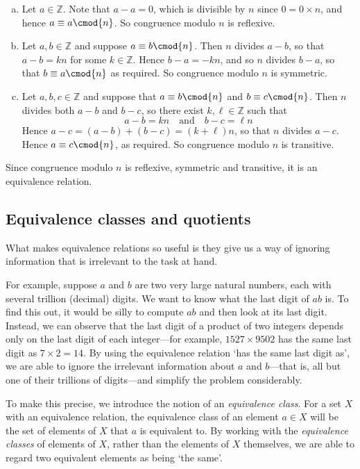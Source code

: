 \begin{cproof}
\fixlistskip
\begin{enumerate}[(a)]
\item Let $a \in \mathbb{Z}$. Note that $a-a=0$, which is divisible by $n$ since $0 = 0 \times n$, and hence $a \equiv a \cmod{n}$. So congruence modulo $n$ is reflexive.
\item Let $a,b \in \mathbb{Z}$ and suppose $a \equiv b \cmod{n}$. Then $n$ divides $a-b$, so that $a-b = kn$ for some $k \in \mathbb{Z}$. Hence $b-a=-kn$, and so $n$ divides $b-a$, so that $b \equiv a \cmod{n}$ as required. So congruence modulo $n$ is symmetric.
\item Let $a,b,c \in \mathbb{Z}$ and suppose that $a \equiv b \cmod{n}$ and $b \equiv c \cmod{n}$. Then $n$ divides both $a-b$ and $b-c$, so there exist $k, \ell \in \mathbb{Z}$ such that
\[ a-b = kn \quad \text{and} \quad b-c = \ell n \]
Hence $a-c = (a-b)+(b-c) = (k+\ell)n$, so that $n$ divides $a-c$. Hence $a \equiv c \cmod{n}$, as required. So congruence modulo $n$ is transitive.
\end{enumerate}
Since congruence modulo $n$ is reflexive, symmetric and transitive, it is an equivalence relation.
\end{cproof}

\subsection*{Equivalence classes and quotients}

What makes equivalence relations so useful is they give us a way of ignoring information that is irrelevant to the task at hand.

For example, suppose $a$ and $b$ are two very large natural numbers, each with several trillion (decimal) digits. We want to know what the last digit of $ab$ is. To find this out, it would be silly to compute $ab$ and then look at its last digit. Instead, we can observe that the last digit of a product of two integers depends only on the last digit of each integer---for example, $1527 \times 9502$ has the same last digit as $7 \times 2 = 14$. By using the equivalence relation `has the same last digit as', we are able to ignore the irrelevant information about $a$ and $b$---that is, all but one of their trillions of digits---and simplify the problem considerably.

To make this precise, we introduce the notion of an \textit{equivalence class}. For a set $X$ with an equivalence relation, the equivalence class of an element $a \in X$ will be the set of elements of $X$ that $a$ is equivalent to. By working with the \textit{equivalence classes} of elements of $X$, rather than the elements of $X$ themselves, we are able to regard two equivalent elements as being `the same'.

